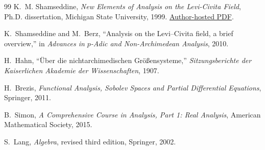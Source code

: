 \documentclass[11pt,a4paper]{article}
\theoremstyle{remark}
\begin{document}
\begin{thebibliography}{99}
K.~M. Shamseddine,
\emph{New Elements of Analysis on the Levi-Civita Field},
Ph.D. dissertation, Michigan State University, 1999.
\href{https://www.physics.umanitoba.ca/~khodr/dissert.pdf}{Author-hosted PDF}.

K.~Shamseddine and M.~Berz,
``Analysis on the Levi--Civita field, a brief overview,''
in \emph{Advances in $p$-Adic and Non-Archimedean Analysis}, 2010.

H.~Hahn,
``\"Uber die nichtarchimedischen Gr\"o\ss ensysteme,''
\emph{Sitzungsberichte der Kaiserlichen Akademie der Wissenschaften}, 1907.

H.~Brezis,
\emph{Functional Analysis, Sobolev Spaces and Partial Differential Equations},
Springer, 2011.

B.~Simon,
\emph{A Comprehensive Course in Analysis, Part 1: Real Analysis},
American Mathematical Society, 2015.

S.~Lang,
\emph{Algebra}, revised third edition, Springer, 2002.
\end{thebibliography}
\end{document}
